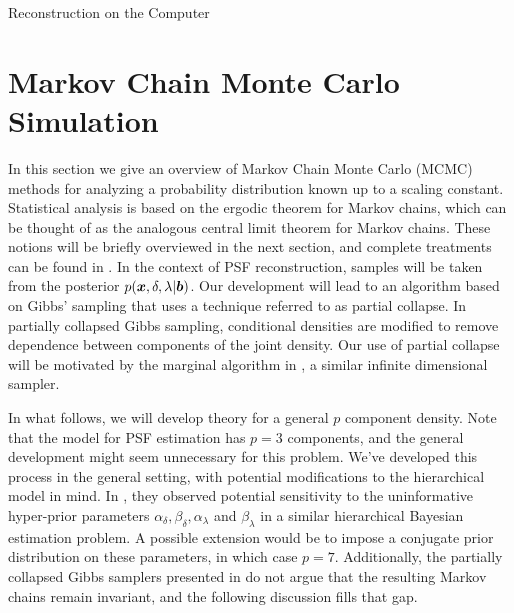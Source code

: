 \begin{chapter}{Reconstruction on the Computer}
\section{Markov Chain Monte Carlo Simulation} \label{sec:pcgibbs}
In this section we give an overview of Markov Chain Monte Carlo (MCMC) methods for analyzing a probability distribution known up to a scaling constant.
Statistical analysis is based on the ergodic theorem for Markov chains, which can be thought of as the analogous central limit theorem for Markov chains. 
These notions will be briefly overviewed in the next section, and complete treatments can be found in \citep{robert2013monte,liu2008monte}.
In the context of PSF reconstruction, samples will be taken from the posterior $p(\mbox{\boldmath$x$},\delta,\lambda|\mbox{\boldmath$b$})$.
Our development will lead to an algorithm based on Gibbs' sampling that uses a technique referred to as partial collapse.  
In partially collapsed Gibbs sampling, conditional densities are modified to remove dependence between components of the joint density.
Our use of partial collapse will be motivated by the marginal algorithm in \citep{agapiou2014analysis}, a similar infinite dimensional sampler.

In what follows, we will develop theory for a general $p$ component density.
Note that the model for PSF estimation has $p=3$ components, and the general development might seem unnecessary for this problem.
We've developed this process in the general setting, with potential modifications to the hierarchical model in mind.
In \citep{howard2015Sensitivity}, they observed potential sensitivity to the uninformative hyper-prior parameters $\alpha_\delta,\beta_\delta,\alpha_\lambda$ and $\beta_\lambda$ in a similar hierarchical Bayesian estimation problem.
A possible extension would be to impose a conjugate prior distribution on these parameters, in which case $p=7$.
Additionally, the partially collapsed Gibbs samplers presented in \citep{van2015metropolis,van2008partially} do not argue that the resulting Markov chains remain invariant, and the following discussion fills that gap.


\end{chapter}

